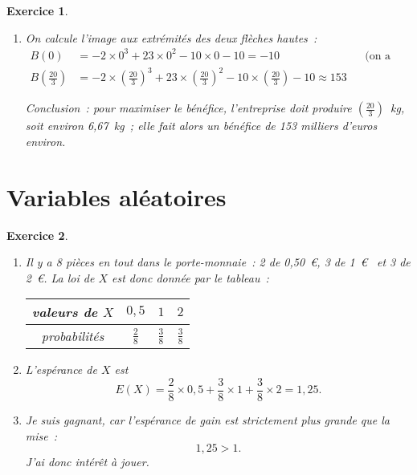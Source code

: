 \documentclass[10pt]{article}
\newtheorem{exo}{Exercice}
\begin{document}
\begin{exo}
\begin{enumerate}
		\item On calcule l'image aux extrémités des deux flèches hautes~:
		\begin{align*}B(0)&=-2\times 0^3+23\times 0^2-10\times 0-10=-10 &&\text{(on a une perte quand on ne produit rien)}\\
		B\left(\frac{20}{3}\right)&=-2\times \left(\frac{20}{3}\right)^3+23\times \left(\frac{20}{3}\right)^2-10\times \left(\frac{20}{3}\right)-10\approx 153 &&
		\end{align*}
		
		Conclusion~: pour maximiser le bénéfice, l'entreprise doit produire $\left(\frac{20}{3}\right)$~kg, soit environ 6,67~kg~; elle fait alors un bénéfice de 153 milliers d'euros environ.
\end{enumerate}


\end{exo}



\section{Variables aléatoires}




\begin{exo}



\begin{enumerate}
\item Il y a 8 pièces en tout dans le porte-monnaie~: 2 de 0,50~\euro, 3 de 1~\euro~{} et 3 de 2~\euro. La loi de $X$ est donc donnée par le tableau~:

\begin{center}
\renewcommand{\arraystretch}{1.5}
\begin{tabular}{|c|c|c|c|}
\hline
    valeurs de $X$     & $0,5$        & $1$       &$2$   \\
\hline
probabilités & $\frac{2}{8}$ &$\frac{3}{8}$ &$\frac{3}{8}$      \\
\hline
\end{tabular}
\end{center}

\item L'espérance de $X$ est
\[E(X)=\frac{2}{8}\times 0,5+\frac{3}{8}\times 1+\frac{3}{8}\times 2=1,25.\]
\item Je suis gagnant, car l'espérance de gain est strictement plus grande que la mise~: \[1,25>1.\] J'ai donc intérêt à jouer.
\end{enumerate}
\end{exo}
\end{document}
